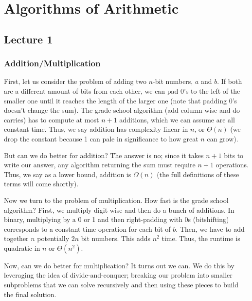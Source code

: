 \section{Algorithms of Arithmetic}

\subsection{Lecture 1}

\subsubsection{Addition/Multiplication}

First, let us consider the problem of adding two $n$-bit numbers, $a$ and $b$. If both are a different amount of bits from each other,
we can pad 0's to the left of the smaller one until it reaches the length of the larger one (note that padding 0's doesn't change the sum).
The grade-school algorithm (add column-wise and do carries)
has to compute at most $n + 1$ additions, which we can assume are all constant-time. Thus, we say addition has complexity linear in $n$,
or $\Theta(n)$ (we drop the constant because 1 can pale in significance to how great $n$ can grow).

But can we do better for addition? The answer is no; since it takes $n + 1$ bits to write our answer, any algorithm returning the sum
must require $n + 1$ operations. Thus, we say as a lower bound, addition is $\Omega(n)$ (the full definitions of these terms will come shortly).

Now we turn to the problem of multiplication. How fast is the grade school algorithm? First, we multiply digit-wise and then do a bunch of additions.
In binary, multiplying by a 0 or 1 and then right-padding with 0s (bitshifting) corresponds to a constant time operation for each bit of $b$.
Then, we have to add together $n$ potentially $2n$ bit numbers. This adds $n^2$ time. Thus, the runtime is quadratic in $n$
or $\Theta(n^2)$.

Now, can we do better for multiplication? It turns out we can. We do this by leveraging the idea of divide-and-conquer;
breaking our problem into smaller subproblems that we can solve recursively and then using these pieces to build the final solution.
